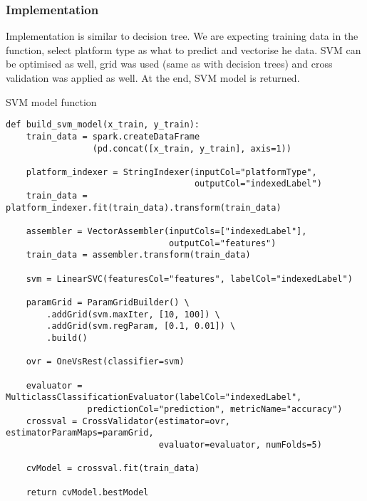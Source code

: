 \subsubsection{Implementation}

Implementation is similar to decision tree. We are expecting training data in the function, select platform type as what to predict and vectorise he data. SVM can be optimised as well, grid was used (same as with decision trees) and cross validation was applied as well. At the end, SVM model is returned.
\begin{listing}[H]
\caption{SVM model function}
\begin{verbatim}
def build_svm_model(x_train, y_train):
    train_data = spark.createDataFrame
                 (pd.concat([x_train, y_train], axis=1))

    platform_indexer = StringIndexer(inputCol="platformType", 
                                     outputCol="indexedLabel")
    train_data = platform_indexer.fit(train_data).transform(train_data)

    assembler = VectorAssembler(inputCols=["indexedLabel"], 
                                outputCol="features")
    train_data = assembler.transform(train_data)

    svm = LinearSVC(featuresCol="features", labelCol="indexedLabel")

    paramGrid = ParamGridBuilder() \
        .addGrid(svm.maxIter, [10, 100]) \
        .addGrid(svm.regParam, [0.1, 0.01]) \
        .build()

    ovr = OneVsRest(classifier=svm)

    evaluator = MulticlassClassificationEvaluator(labelCol="indexedLabel", 
                predictionCol="prediction", metricName="accuracy")
    crossval = CrossValidator(estimator=ovr, estimatorParamMaps=paramGrid, 
                              evaluator=evaluator, numFolds=5)

    cvModel = crossval.fit(train_data)

    return cvModel.bestModel
\end{verbatim}
\end{listing}




























